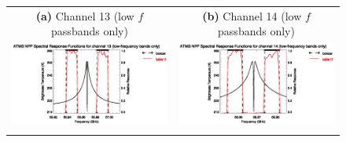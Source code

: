 \begin{figure}[H]
  \centering
  \begin{tabular}{c c}
    \textsf{\textbf{(a)} Channel 13 (low $f$ passbands only)} &
    \textsf{\textbf{(b)} Channel 14 (low $f$ passbands only)} \\
    \includegraphics[bb=70 400 300 559,clip,scale=1.0]{graphics/srf/table12/atms_npp.ch13.osrf.eps} &
    \includegraphics[bb=70 400 300 559,clip,scale=1.0]{graphics/srf/table12/atms_npp.ch14.osrf.eps} \\\\


\end{tabular}
\end{figure}
